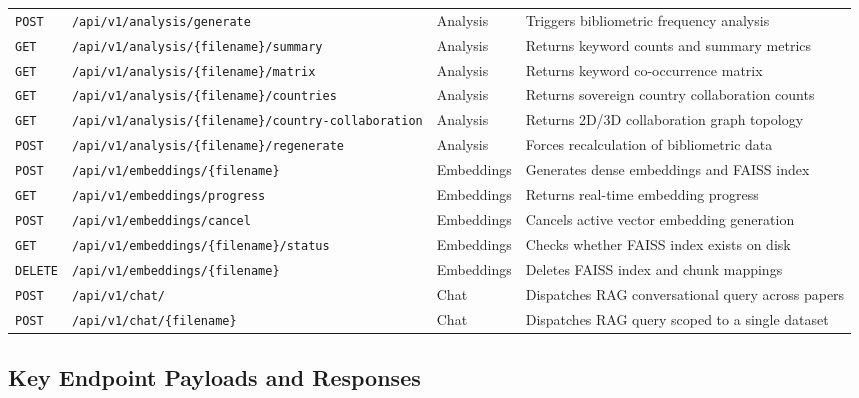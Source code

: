 \begin{longtable}{l p{5.5cm} p{2.2cm} X}
\midrule
\texttt{POST} & \texttt{/api/v1/analysis/generate} & Analysis & Triggers bibliometric frequency analysis \\
\texttt{GET} & \texttt{/api/v1/analysis/\{filename\}/summary} & Analysis & Returns keyword counts and summary metrics \\
\texttt{GET} & \texttt{/api/v1/analysis/\{filename\}/matrix} & Analysis & Returns keyword co-occurrence matrix \\
\texttt{GET} & \texttt{/api/v1/analysis/\{filename\}/countries} & Analysis & Returns sovereign country collaboration counts \\
\texttt{GET} & \texttt{/api/v1/analysis/\{filename\}/country-collaboration} & Analysis & Returns 2D/3D collaboration graph topology \\
\texttt{POST} & \texttt{/api/v1/analysis/\{filename\}/regenerate} & Analysis & Forces recalculation of bibliometric data \\
\midrule
\texttt{POST} & \texttt{/api/v1/embeddings/\{filename\}} & Embeddings & Generates dense embeddings and FAISS index \\
\texttt{GET} & \texttt{/api/v1/embeddings/progress} & Embeddings & Returns real-time embedding progress \\
\texttt{POST} & \texttt{/api/v1/embeddings/cancel} & Embeddings & Cancels active vector embedding generation \\
\texttt{GET} & \texttt{/api/v1/embeddings/\{filename\}/status} & Embeddings & Checks whether FAISS index exists on disk \\
\texttt{DELETE} & \texttt{/api/v1/embeddings/\{filename\}} & Embeddings & Deletes FAISS index and chunk mappings \\
\midrule
\texttt{POST} & \texttt{/api/v1/chat/} & Chat & Dispatches RAG conversational query across papers \\
\texttt{POST} & \texttt{/api/v1/chat/\{filename\}} & Chat & Dispatches RAG query scoped to a single dataset \\
\end{longtable}

\subsection{Key Endpoint Payloads and Responses}

